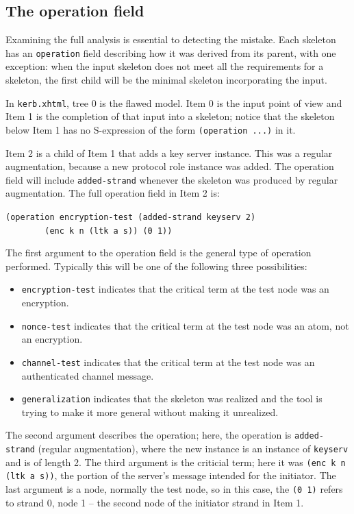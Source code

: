 \subsection{The operation field}
\label{sec:operation}
 Examining the full {\cpsa} analysis is
essential to detecting the mistake.  Each skeleton has an
\texttt{operation} field describing how it was derived from its
parent, with one exception: when the input skeleton does not meet all
the requirements for a skeleton, the first child will be the minimal
skeleton incorporating the input.

In \texttt{kerb.xhtml}, tree 0 is the flawed model.  Item 0 is the input
point of view and Item 1 is the completion of that input into a
skeleton; notice that the skeleton below Item 1 has no S-expression of
the form \texttt{(operation ...)} in it.

 Item 2 is a child of Item 1 that adds a key
server instance.  This was a regular augmentation, because a new
protocol role instance was added.  The operation field will include
\texttt{added-strand} whenever the skeleton was produced by regular
augmentation.  The full operation field in Item 2 is:

\begin{center}
\verb|(operation encryption-test (added-strand keyserv 2)|\\
\verb|        (enc k n (ltk a s)) (0 1))|
\end{center}

The first argument to the operation field is the general type of
operation performed.  Typically this will be one of the following
three possibilities:

\begin{itemize}
\item \texttt{encryption-test} indicates that the critical term at the
  test node was an encryption.
\item \texttt{nonce-test} indicates that the critical term at the test
  node was an atom, not an encryption.
\item \texttt{channel-test} indicates that the critical term at the test
  node was an authenticated channel message.
\item \texttt{generalization} indicates that the skeleton was realized
  and the tool is trying to make it more general without making it
  unrealized.
\end{itemize}

The second argument describes the operation; here, the operation is
\texttt{added-strand} (regular augmentation), where the new instance
is an instance of \texttt{keyserv} and is of length 2.  The third
argument is the criticial term; here it was \texttt{(enc k n (ltk a s))},
the portion of the server's message intended for the initiator.  The
last argument is a node, normally the test node, so in this case, the
\texttt{(0 1)} refers to strand 0, node 1 -- the second node of the
initiator strand in Item 1.

